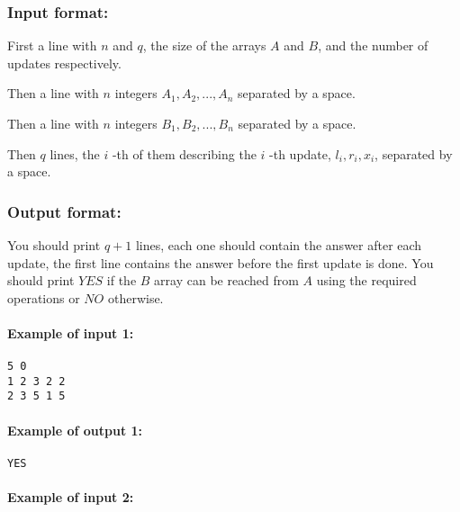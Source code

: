 \hypertarget{input-format}{%
\subsubsection{Input format:}\label{input-format}}

First a line with \(n\) and \(q\), the size of the arrays \(A\) and
\(B\), and the number of updates respectively.

Then a line with \(n\) integers \(A_1, A_2, ..., A_n\) separated by a
space.

Then a line with \(n\) integers \(B_1, B_2, ..., B_n\) separated by a
space.

Then \(q\) lines, the \(i\) -th of them describing the \(i\) -th update,
\(l_i, r_i, x_i\), separated by a space.

\hypertarget{output-format}{%
\subsubsection{Output format:}\label{output-format}}

You should print \(q + 1\) lines, each one should contain the answer
after each update, the first line contains the answer before the first
update is done. You should print \(YES\) if the \(B\) array can be
reached from \(A\) using the required operations or \(NO\) otherwise.

\hypertarget{example-of-input-1}{%
\paragraph{Example of input 1:}\label{example-of-input-1}}

\begin{verbatim}
5 0
1 2 3 2 2
2 3 5 1 5
\end{verbatim}

\hypertarget{example-of-output-1}{%
\paragraph{Example of output 1:}\label{example-of-output-1}}

\begin{verbatim}
YES
\end{verbatim}

\hypertarget{example-of-input-2}{%
\paragraph{Example of input 2:}\label{example-of-input-2}}

